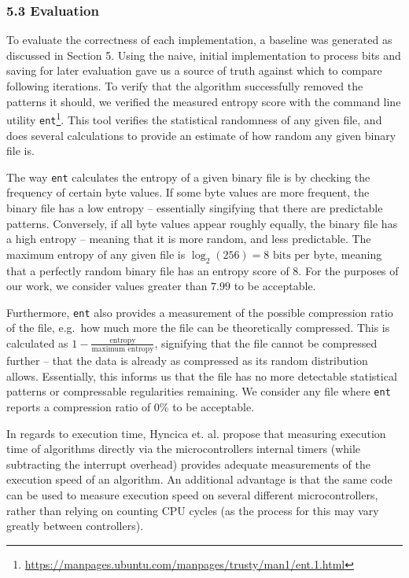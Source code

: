 \subsubsection{5.3 Evaluation}\label{evaluation}

To evaluate the correctness of each implementation, a baseline was generated as discussed in Section 5. Using the naive, initial implementation to process bits and saving for later evaluation gave us a source of truth against which to compare following iterations. To verify that the algorithm successfully removed the patterns it should, we verified the measured entropy score with the command line utility \texttt{ent}\footnote{\url{https://manpages.ubuntu.com/manpages/trusty/man1/ent.1.html}}. This tool verifies the statistical randomness of any given file, and does several calculations to provide an estimate of how random any given binary file is.

The way \texttt{ent} calculates the entropy of a given binary file is by checking the frequency of certain byte values. If some byte values are more frequent, the binary file has a low entropy -- essentially singifying that there are predictable patterns. Conversely, if all byte values appear roughly equally, the binary file has a high entropy -- meaning that it is more random, and less predictable. The maximum entropy of any given file is \(\log_2(256) = 8 \text{ bits per byte}\), meaning that a perfectly random binary file has an entropy score of 8. For the purposes of our work, we consider values greater than \(7.99\) to be acceptable.

Furthermore, \texttt{ent} also provides a measurement of the possible compression ratio of the file, e.g.~how much more the file can be theoretically compressed. This is calculated as \(1 - \frac{\text{entropy}}{\text{maximum entropy}}\), signifying that the file cannot be compressed further -- that the data is already as compressed as its random distribution allows. Essentially, this informs us that the file has no more detectable statistical patterns or compressable regularities remaining. We consider any file where \texttt{ent} reports a compression ratio of \(0\%\) to be acceptable.

In regards to execution time, Hyncica et. al. \cite{micromeasurements} propose that measuring execution time of algorithms directly via the microcontrollers internal timers (while subtracting the interrupt overhead) provides adequate measurements of the execution speed of an algorithm. An additional advantage is that the same code can be used to measure execution speed on several different microcontrollers, rather than relying on counting CPU cycles (as the process for this may vary greatly between controllers).

